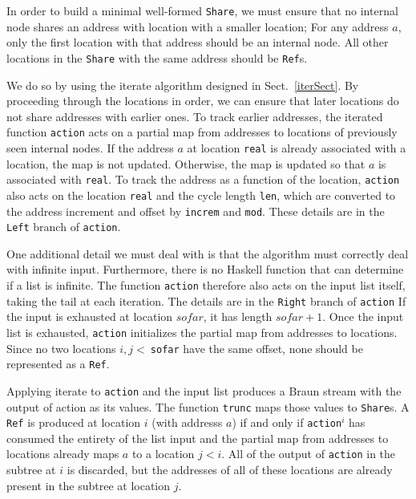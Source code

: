 \documentclass[envcountsect]{llncs}
\newcommand{\share}{{\tt Share} }
\begin{document}
In order to build a minimal well-formed {\tt Share}, we must ensure that no internal node shares an address with location with a smaller location;
For any address $a$, only the first location with that address should be an internal node.
All other locations in the \share with the same address should be {\tt Ref}s.

We do so by using the iterate algorithm designed in Sect.~\ref{iterSect}.
By proceeding through the locations in order, we can ensure that later locations do not share addresses with earlier ones.
To track earlier addresses, the iterated function {\tt action} acts on a partial map from addresses to locations of previously seen internal nodes.
If the address $a$ at location {\tt real} is already associated with a location, the map is not updated.
Otherwise, the map is updated so that $a$ is associated with {\tt real}.
To track the address as a function of the location, {\tt action} also acts on the location {\tt real} and the cycle length {\tt len}, which are converted to the address increment and offset by {\tt increm} and {\tt mod}.
These details are in the {\tt Left} branch of {\tt action}.

One additional detail we must deal with is that the algorithm must correctly deal with infinite input.
Furthermore, there is no Haskell function that can determine if a list is infinite.
The function {\tt action} therefore also acts on the input list itself, taking the tail at each iteration.
The details are in the {\tt Right} branch of {\tt action}
If the input is exhausted at location $sofar$, it has length $sofar+1$.
Once the input list is exhausted, {\tt action} initializes the partial map from addresses to locations.
Since no two locations $i,j <\ ${\tt sofar} have the same offset, none should be represented as a {\tt Ref}.

Applying iterate to {\tt action} and the input list produces a Braun stream with the output of action as its values.
The function {\tt trunc} maps those values to {\tt Share}s.
A {\tt Ref} is produced at location $i$ (with addresss $a$) if and only if {\tt action}$^i$ has consumed the entirety of the list input and the partial map from addresses to locations already maps $a$ to a location $j < i$.
All of the output of {\tt action} in the subtree at $i$ is discarded, but the addresses of all of these locations are already present in the subtree at location $j$.
\end{document}
